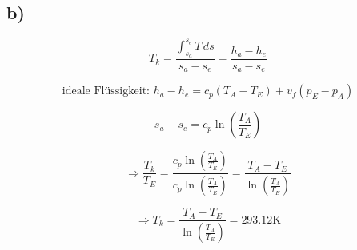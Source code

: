

\subsection*{b)}

\[
T_k = \frac{\int_{s_a}^{s_e} T \, ds}{s_a - s_e} = \frac{h_a - h_e}{s_a - s_e}
\]

\[
\text{ideale Flüssigkeit: } h_a - h_e = c_p (T_A - T_E) + v_f (p_E - p_A)
\]

\[
s_a - s_e = c_p \ln \left( \frac{T_A}{T_E} \right)
\]

\[
\Rightarrow \frac{T_k}{T_E} = \frac{c_p \ln \left( \frac{T_A}{T_E} \right)}{c_p \ln \left( \frac{T_A}{T_E} \right)} = \frac{T_A - T_E}{\ln \left( \frac{T_A}{T_E} \right)}
\]

\[
\Rightarrow T_k = \frac{T_A - T_E}{\ln \left( \frac{T_A}{T_E} \right)} = 293.12 \text{K}
\]